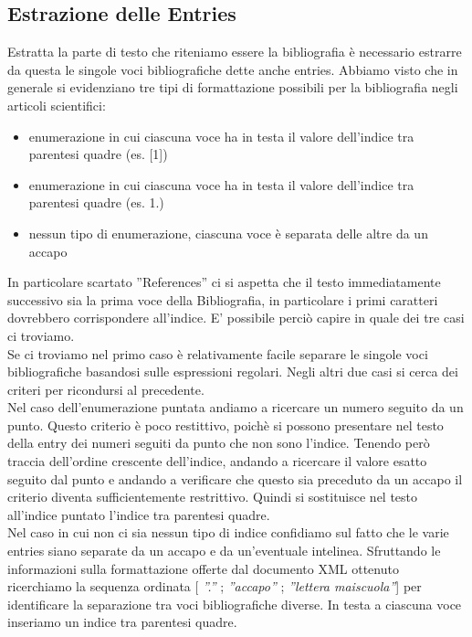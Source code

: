 \subsection{Estrazione delle Entries}
Estratta la parte di testo che riteniamo essere la bibliografia è necessario estrarre da questa le singole voci bibliografiche dette anche entries. Abbiamo visto che in generale si evidenziano tre tipi di formattazione possibili per la bibliografia negli articoli scientifici:
\begin{itemize}
 \item enumerazione in cui ciascuna voce ha in testa il valore dell'indice tra parentesi quadre (es. [1])
 \item enumerazione in cui ciascuna voce ha in testa il valore dell'indice tra parentesi quadre (es.  1.)
 \item nessun tipo di enumerazione, ciascuna voce è separata delle altre da un accapo
\end{itemize}
In particolare scartato ''References'' ci si aspetta che il testo immediatamente successivo sia la prima voce della Bibliografia, in particolare i primi caratteri dovrebbero corrispondere all'indice. E' possibile perciò capire in quale dei tre casi ci troviamo.
\\
Se ci troviamo nel primo caso è relativamente facile separare le singole voci bibliografiche basandosi sulle espressioni regolari. Negli altri due casi si cerca dei criteri per ricondursi al precedente.
\\
Nel caso dell'enumerazione puntata andiamo a ricercare un numero seguito da un punto. Questo criterio è poco restittivo, poichè si possono presentare nel testo della entry dei numeri seguiti da punto che non sono l'indice. Tenendo però traccia dell'ordine crescente dell'indice, andando a ricercare il valore esatto seguito dal punto e andando a verificare che questo sia preceduto da un accapo il criterio diventa sufficientemente restrittivo. Quindi si sostituisce nel testo all'indice puntato l'indice tra parentesi quadre.
\\
Nel caso in cui non ci sia nessun tipo di indice confidiamo sul fatto che le varie entries siano separate da un accapo e da un'eventuale intelinea. Sfruttando le informazioni sulla formattazione offerte dal documento XML ottenuto ricerchiamo la sequenza ordinata [ \textit{''.''} ; \textit{''accapo''} ; \textit{''lettera maiscuola''}] per identificare la separazione tra voci bibliografiche diverse. In testa a ciascuna voce inseriamo un indice tra parentesi quadre.

